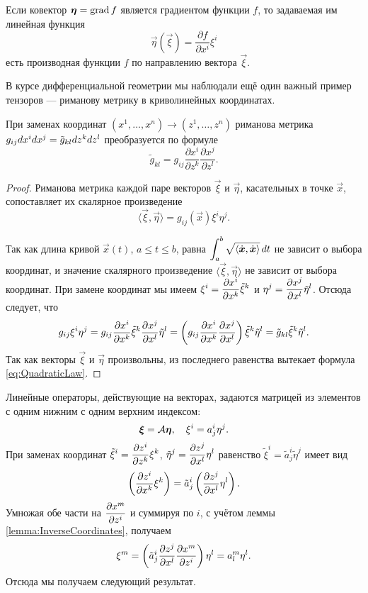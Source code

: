 Если ковектор $\boldsymbol{\eta} = \operatorname{grad} f$ является градиентом функции $f$, то задаваемая им линейная функция
\[
	\vec{\eta}(\vec{\xi}) = \frac{\partial f}{\partial x^i}\xi^i
\]
есть производная функции $f$ по направлению вектора $\vec{\xi}$.

В курсе дифференциальной геометрии мы наблюдали ещё один важный пример тензоров --- риманову метрику в криволинейных координатах.

\begin{theorem}
	При заменах координат $(x^1, \ldots, x^n) \to (z^1, \ldots, z^n)$ риманова метрика $g_{ij}dx^idx^j \hm= \tilde{g}_{kl}dz^kdz^l$ преобразуется по формуле
	\begin{equation} \label{eq:QuadraticLaw}
		\tilde{g}_{kl} = g_{ij}\frac{\partial x^i}{\partial z^k}\frac{\partial x^j}{\partial z^l}.
	\end{equation}
\end{theorem}

\begin{proof}
	Риманова метрика каждой паре векторов $\vec{\xi}$ и $\vec{\eta}$, касательных в точке $\vec{x}$, сопоставляет их скалярное произведение
	\[
		\langle\vec{\xi}, \vec{\eta}\rangle = g_{ij}(\vec{x})\xi^i\eta^j.
	\]

	Так как длина кривой $\vec{x}(t)$, $a \leqslant t \leqslant b$, равна $\displaystyle\int_a^b\sqrt{\langle\dot{\boldsymbol{x}}, \dot{\boldsymbol{x}}\rangle}\,dt$ не зависит о выбора координат, и значение скалярного произведение $\langle\vec{\xi}, \vec{\eta}\rangle$ не зависит от выбора координат. При замене координат мы имеем $\displaystyle\xi^i = \frac{\partial x^i}{\partial x^k}\tilde{\xi}^k$ и $\displaystyle\eta^j = \frac{\partial x^j}{\partial x^l}\tilde{\eta}^l$. Отсюда следует, что
	\[
		g_{ij}\xi^i\eta^j = g_{ij}\frac{\partial x^i}{\partial x^k}\tilde{\xi}^k\frac{\partial x^j}{\partial x^l}\tilde{\eta}^l = \left(g_{ij}\frac{\partial x^i}{\partial x^k}\frac{\partial x^j}{\partial x^l}\right)\tilde{\xi}^k\tilde{\eta}^l = \tilde{g}_{kl}\tilde{\xi}^k\tilde{\eta}^l.
	\]
	Так как векторы $\vec{\xi}$ и $\vec{\eta}$ произвольны, из последнего равенства вытекает формула \eqref{eq:QuadraticLaw}.
\end{proof}

Линейные операторы, действующие на векторах, задаются матрицей из элементов с одним нижним с одним верхним индексом:
\[
	\boldsymbol{\xi} = \mathcal{A}\boldsymbol{\eta},\quad \xi^i = a^i_j\eta^j.
\]
При заменах координат $\displaystyle\tilde{\xi}^i = \frac{\partial z^i}{\partial z^k}\xi^k$, $\displaystyle\tilde{\eta}^j = \frac{\partial z^j}{\partial x^l}\eta^l$ равенство $\tilde{\xi}^i = \tilde{a}^i_j\tilde{\eta}^j$ имеет вид
\[
	\left(\frac{\partial z^i}{\partial x^k}\xi^k\right) = \tilde{a}^i_j\left(\frac{\partial z^j}{\partial x^l}\eta^l\right).
\]
Умножая обе части на $\displaystyle\frac{\partial x^m}{\partial z^i}$ и суммируя по $i$, с учётом леммы \ref{lemma:InverseCoordinates}, получаем
\[
	\xi^m = \left(\tilde{a}^i_j\frac{\partial z^j}{\partial x^l}\frac{\partial x^m}{\partial z^i}\right)\eta^l = a^m_l\eta^l.
\]
Отсюда мы получаем следующий результат.

